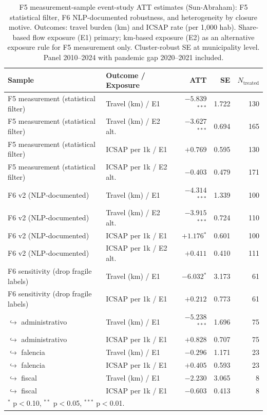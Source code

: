 \begin{table}[h!]
\centering
\caption{F5 measurement-sample event-study ATT estimates (Sun-Abraham): F5 statistical filter, F6 NLP-documented robustness, and heterogeneity by closure motive. Outcomes: travel burden (km) and ICSAP rate (per 1{,}000 hab). Share-based flow exposure (E1) primary; km-based exposure (E2) as an alternative exposure rule for F5 measurement only. Cluster-robust SE at municipality level. Panel 2010--2024 with pandemic gap 2020--2021 included.}
\label{tab:es-final}
\small
\begin{tabular}{llrrr}
\toprule
Sample & Outcome / Exposure & ATT & SE & $N_{\text{treated}}$ \\
\midrule
F5 measurement (statistical filter) & Travel (km) / E1 & $-5.839$$^{***}$ & 1.722 & 130 \\
F5 measurement (statistical filter) & Travel (km) / E2 alt. & $-3.627$$^{***}$ & 0.694 & 165 \\
F5 measurement (statistical filter) & ICSAP per 1k / E1 & $+0.769$ & 0.595 & 130 \\
F5 measurement (statistical filter) & ICSAP per 1k / E2 alt. & $-0.403$ & 0.479 & 171 \\
\addlinespace
F6 v2 (NLP-documented) & Travel (km) / E1 & $-4.314$$^{***}$ & 1.339 & 100 \\
F6 v2 (NLP-documented) & Travel (km) / E2 alt. & $-3.915$$^{***}$ & 0.724 & 110 \\
F6 v2 (NLP-documented) & ICSAP per 1k / E1 & $+1.176$$^{*}$ & 0.601 & 100 \\
F6 v2 (NLP-documented) & ICSAP per 1k / E2 alt. & $+0.411$ & 0.410 & 111 \\
\addlinespace
F6 sensitivity (drop fragile labels) & Travel (km) / E1 & $-6.032$$^{*}$ & 3.173 & 61 \\
F6 sensitivity (drop fragile labels) & ICSAP per 1k / E1 & $+0.212$ & 0.773 & 61 \\
  $\hookrightarrow$ administrativo & Travel (km) / E1 & $-5.238$$^{***}$ & 1.696 & 75 \\
  $\hookrightarrow$ administrativo & ICSAP per 1k / E1 & $+0.828$ & 0.707 & 75 \\
  $\hookrightarrow$ falencia & Travel (km) / E1 & $-0.296$ & 1.171 & 23 \\
  $\hookrightarrow$ falencia & ICSAP per 1k / E1 & $+0.405$ & 0.593 & 23 \\
  $\hookrightarrow$ fiscal & Travel (km) / E1 & $-2.230$ & 3.065 & 8 \\
  $\hookrightarrow$ fiscal & ICSAP per 1k / E1 & $-0.603$ & 0.413 & 8 \\
\bottomrule
\multicolumn{5}{l}{\footnotesize $^{*}$ p$<$0.10, $^{**}$ p$<$0.05, $^{***}$ p$<$0.01.} \\
\end{tabular}
\end{table}
